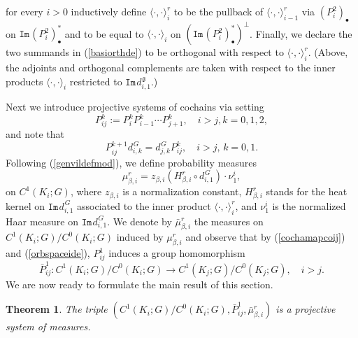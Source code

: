 \documentclass[11pt,reqno]{amsart}
\numberwithin{equation}{section}
\newtheorem{theorem}{Theorem}[section]
\theoremstyle{remark}
\theoremstyle{rmdefinition}
\begin{document}
for every $i>0$ inductively define $\langle \cdot, \cdot \rangle_{i}^r$   to be the pullback of $\langle \cdot, \cdot \rangle_{i-1}^r$ via $(P^2_{i})_{\bullet}$ on $\mathtt{Im}\hspace{1pt}(P^2_{i})_{\bullet}^*$ and to be equal to $\langle \cdot, \cdot \rangle_{i}$ on $(\mathtt{Im}\hspace{1pt}(P^2_{i})_{\bullet}^*)^{\perp}$.
Finally, we declare the two summands in (\ref{basiorthde}) to be orthogonal with respect to  $\langle \cdot, \cdot \rangle_{i}^r$. (Above, the adjoints and orthogonal complements are taken with respect to the inner products $\langle \cdot, \cdot \rangle_{i}$ restricted to $\mathtt{Im}\hspace{1pt}d_{i,1}^{\hspace{1pt}\mathfrak g}$.)

Next we introduce projective systems of cochains via setting
$$P^k_{ij}:=P^k_{i} P^k_{i-1} \cdots  P^k_{j+1}, \quad i>j, k=0,1,2,$$
and note that 
\begin{equation}\label{cochamapcoij}
	P^{k+1}_{ij}d^{\hspace{1pt}G}_{i,k} =d^{\hspace{1pt}G}_{j,k} P^k_{ij}, \quad i>j,\,k=0,1.
\end{equation}
Following (\ref{genvildefmod}), we define probability measures
\begin{equation}\label{genvildefiver}
	\mu^r_{\beta,i}=z_{\beta,i} (H^r_{\beta,i} \circ d_{i,1}^{\hspace{1pt}G}) \cdot \nu^i_1,
\end{equation}
on $C^1(K_i;G)$, where $z_{\beta,i}$ is a normalization constant, $H^r_{\beta,i}$ stands for the heat kernel on $\mathtt{Im}\hspace{1pt}d_{i,1}^{\hspace{1pt}G}$ associated to the inner product  $\langle \cdot, \cdot \rangle_{i}^r$, and $\nu^i_1$ is the normalized Haar measure on $\mathtt{Im}\hspace{1pt}d_{i,1}^{\hspace{1pt}G}$.
We denote by $\bar{\mu}^r_{\beta,i}$ the measures on $C^1(K_i;G)/C^0(K_i;G)$ induced by $\mu^r_{\beta,i}$ and observe that by 
(\ref{cochamapcoij}) and (\ref{orbspaceide}), $P^1_{ij}$ induces a group homomorphism
$$ \bar{P}^1_{ij}: C^1(K_i;G)/C^0(K_i;G)  \to C^1(K_j;G)/C^0(K_j;G), \quad i>j.$$
We are now ready to formulate the main result of this section.
\begin{theorem}\label{mainconstrthe}
	The triple $(C^1(K_i;G)/C^0(K_i;G),\bar{P}^1_{ij},\bar{\mu}^r_{\beta,i})$ is a projective system of measures.
\end{theorem}
\end{document}

